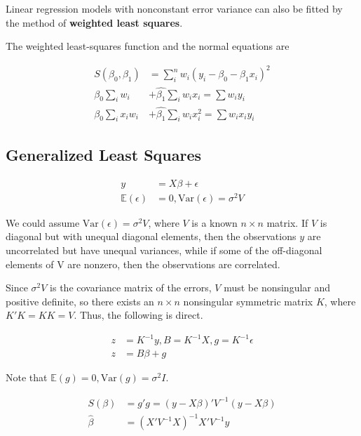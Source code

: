 \documentclass[12pt]{article}
\begin{document}
Linear regression models with nonconstant error variance can also be fitted by the method of \textbf{weighted least squares}. 

The weighted least-squares function and the normal equations are 


$$
\begin{aligned}
S(\beta_0, \beta_1) &= \sum_i^n w_i (y_i - \beta_0 - \beta_1 x_i)^2 \\[10pt]
\hat{\beta_0} \sum_i w_i &+ \hat{\beta_1} \sum_i w_i x_i = \sum w_i y_i \\[8pt]
\hat{\beta_0} \sum_i x_i w_i &+ \hat{\beta_1} \sum_i w_i x_i^2 = \sum w_i x_i y_i
\end{aligned}
$$

\subsection{Generalized Least Squares}

$$
\begin{aligned}
y &= X \beta + \epsilon \\[10pt]
\mathbb{E}(\epsilon) &= 0, \mathrm{Var}(\epsilon) = \sigma^2V 
\end{aligned}
$$

We could assume $\mathrm{Var}(\epsilon) = \sigma^2 V $, where $V$ is a known $n \times n$ matrix. If $V$ is diagonal but with unequal diagonal elements, then the observations $y$ are uncorrelated but have unequal variances, while if some of the off-diagonal elements of V are nonzero, then the observations are correlated. 

Since $\sigma^2V$ is the covariance matrix of the errors, $V$ must be nonsingular and positive definite, so there exists an $n \times n$ nonsingular symmetric matrix $K$, where $K′K = KK = V$. Thus, the following is direct.

$$
\begin{aligned}
z &= K^{-1}y, B=K^{-1}X, g=K^{-1}\epsilon \\[8pt]
z &= B\beta + g
\end{aligned}
$$

Note that $\mathbb{E}(g) =0, \mathrm{Var}(g)=\sigma^2I$.

$$
\begin{aligned}
S(\beta) &= g'g = (y - X\beta)'V^{-1}(y-X\beta) \\[8pt]
\hat{\beta} &= (X'V^{-1}X)^{-1}X'V^{-1}y 
\end{aligned}
$$
\end{document}
